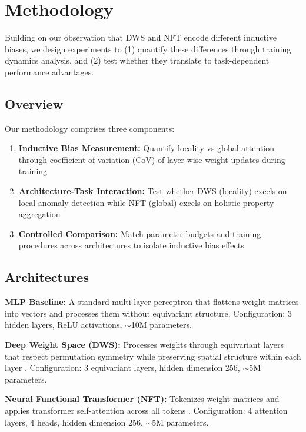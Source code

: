 \section{Methodology}

Building on our observation that DWS and NFT encode different inductive biases, we design experiments to (1) quantify these differences through training dynamics analysis, and (2) test whether they translate to task-dependent performance advantages.

\subsection{Overview}

Our methodology comprises three components:

\begin{enumerate}
    \item \textbf{Inductive Bias Measurement:} Quantify locality vs global attention through coefficient of variation (CoV) of layer-wise weight updates during training
    \item \textbf{Architecture-Task Interaction:} Test whether DWS (locality) excels on local anomaly detection while NFT (global) excels on holistic property aggregation
    \item \textbf{Controlled Comparison:} Match parameter budgets and training procedures across architectures to isolate inductive bias effects
\end{enumerate}

\subsection{Architectures}

\textbf{MLP Baseline:} A standard multi-layer perceptron that flattens weight matrices into vectors and processes them without equivariant structure. Configuration: 3 hidden layers, ReLU activations, $\sim$10M parameters.

\textbf{Deep Weight Space (DWS):} Processes weights through equivariant layers that respect permutation symmetry while preserving spatial structure within each layer \cite{navon2023dws}. Configuration: 3 equivariant layers, hidden dimension 256, $\sim$5M parameters.

\textbf{Neural Functional Transformer (NFT):} Tokenizes weight matrices and applies transformer self-attention across all tokens \cite{zhou2024nft}. Configuration: 4 attention layers, 4 heads, hidden dimension 256, $\sim$5M parameters.

